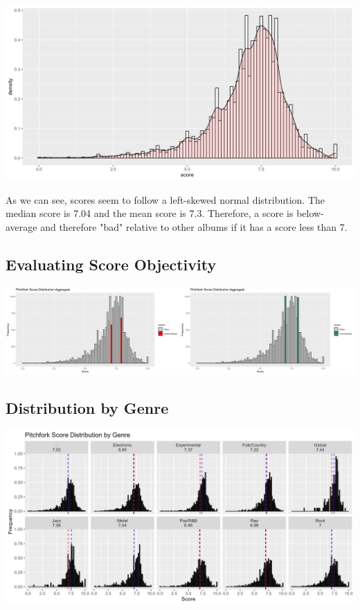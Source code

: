 \documentclass[a4paper,12pt]{article}
\begin{document}
\includegraphics[width = \linewidth]{"figures/score_distribution.png"}

As we can see, scores seem to follow a left-skewed normal distribution. The median score is 7.04 and the mean score is 7.3. Therefore, a score is below-average and therefore "bad" relative to other albums if it has a score less than 7. 
\subsection{Evaluating Score Objectivity}

\includegraphics[width = \linewidth]{"figures/underoverindexing.png"}

\subsection{Distribution by Genre}

\includegraphics[width = \linewidth]{"figures/score_dist_by_genre.png"}
\end{document}
